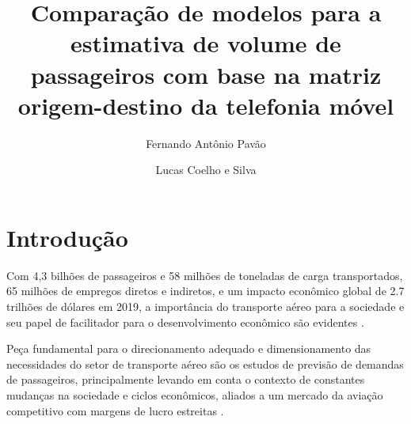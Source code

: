 \documentclass[a4paper,9pt,twocolumn,twoside,]{pinp}
\title{Comparação de modelos para a estimativa de volume de passageiros com
base na matriz origem-destino da telefonia móvel}
\author[a]{Fernando Antônio Pavão}
\author[a]{Lucas Coelho e Silva}
\affil[a]{Departamento de Transporte Aéreo, Instituto Tecnológico de Aeronáutica}
\begin{document}
\verticaladjustment{-2pt}

\maketitle
\thispagestyle{firststyle}



\hypertarget{introduuxe7uxe3o}{%
\section{Introdução}\label{introduuxe7uxe3o}}

Com 4,3 bilhões de passageiros e 58 milhões de toneladas de carga
transportados, 65 milhões de empregos diretos e indiretos, e um impacto
econômico global de 2.7 trilhões de dólares em 2019, a importância do
transporte aéreo para a sociedade e seu papel de facilitador para o
desenvolvimento econômico são evidentes \citep{ihlg_aviation_2019}.

Peça fundamental para o direcionamento adequado e dimensionamento das
necessidades do setor de transporte aéreo são os estudos de previsão de
demandas de passageiros, principalmente levando em conta o contexto de
constantes mudanças na sociedade e ciclos econômicos, aliados a um
mercado da aviação competitivo com margens de lucro estreitas
\citep{srisaeng_forecasting_2015}.
\end{document}
